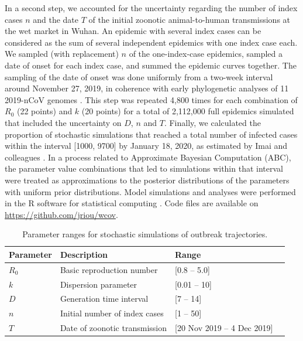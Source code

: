\documentclass[a4]{article}
\begin{document}
In a second step, we accounted for the uncertainty regarding the number of index cases $n$ and the date $T$ of the initial zoonotic animal-to-human transmissions at the wet market in Wuhan. 
An epidemic with several index cases can be considered as the sum of several independent epidemics with one index case each.
We sampled (with replacement) $n$ of the one-index-case epidemics, sampled a date of onset for each index case, and summed the epidemic curves together.
The sampling of the date of onset was done uniformly from a two-week interval around November 27, 2019, in coherence with early phylogenetic analyses of 11 2019-nCoV genomes \cite{Rambaut:2020}.
This step was repeated 4,800 times for each combination of $R_0$ (22 points) and $k$ (20 points) for a total of 2,112,000 full epidemics simulated that included the uncertainty on $D$, $n$ and $T$.
Finally, we calculated the proportion of stochastic simulations that reached a total number of infected cases within the interval [1000, 9700] by January 18, 2020, as estimated by Imai and colleagues \cite{Imai:2020}.
In a process related to Approximate Bayesian Computation (ABC), the parameter value combinations that led to simulations within that interval were treated as approximations to the posterior distributions of the parameters with uniform prior distributions.
Model simulations and analyses were performed in the R software for statistical computing \cite{R:2018}.
Code files are available on \url{https://github.com/jriou/wcov}.

\begin{table}
	\centering
	\caption{Parameter ranges for stochastic simulations of outbreak trajectories.}
	\label{fig:tab1}
\begin{tabular}{llll}
	\hline
	Parameter & Description & Range   \\
	\hline 
	$R_0$& Basic reproduction number  &[0.8 -- 5.0] \\ 
	$k$ & Dispersion parameter & [0.01 -- 10] \\
	$D$ & Generation time interval & [7 -- 14]  \\
	$n$ & Initial number of index cases & [1 -- 50]  \\
	$T$ & Date of zoonotic transmission & [20 Nov 2019 -- 4 Dec 2019] \\
	
	\hline 
\end{tabular} 
\end{table}
\end{document}
